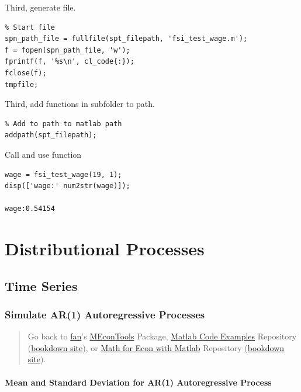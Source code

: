\documentclass[
]{book}
\begin{document}
Third, generate file.

\begin{verbatim}
% Start file
spn_path_file = fullfile(spt_filepath, 'fsi_test_wage.m');
f = fopen(spn_path_file, 'w');
fprintf(f, '%s\n', cl_code{:});
fclose(f);
tmpfile;
\end{verbatim}

Third, add functions in subfolder to path.

\begin{verbatim}
% Add to path to matlab path
addpath(spt_filepath);
\end{verbatim}

Call and use function

\begin{verbatim}
wage = fsi_test_wage(19, 1);
disp(['wage:' num2str(wage)]);

wage:0.54154
\end{verbatim}

\hypertarget{distributional-processes}{%
\chapter{Distributional Processes}\label{distributional-processes}}

\hypertarget{time-series}{%
\section{Time Series}\label{time-series}}

\hypertarget{simulate-ar1-autoregressive-processes}{%
\subsection{Simulate AR(1) Autoregressive Processes}\label{simulate-ar1-autoregressive-processes}}

\begin{quote}
Go back to \href{http://fanwangecon.github.io/}{fan}'s \href{https://fanwangecon.github.io/MEconTools/}{MEconTools} Package, \href{https://fanwangecon.github.io/M4Econ/}{Matlab Code Examples} Repository (\href{https://fanwangecon.github.io/M4Econ/bookdown}{bookdown site}), or \href{https://fanwangecon.github.io/Math4Econ/}{Math for Econ with Matlab} Repository (\href{https://fanwangecon.github.io/Math4Econ/bookdown}{bookdown site}).
\end{quote}

\hypertarget{mean-and-standard-deviation-for-ar1-autoregressive-process}{%
\subsubsection{Mean and Standard Deviation for AR(1) Autoregressive Process}\label{mean-and-standard-deviation-for-ar1-autoregressive-process}}
\end{document}
